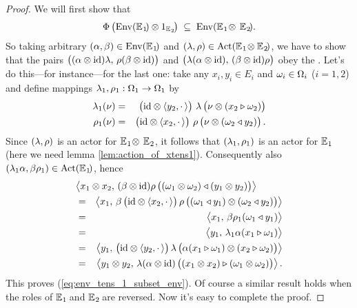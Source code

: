 \begin{proof}
  We will first show that
  \begin{equation} \label{eq:env_tens_1_subset_env}
    \Phi\left(\vertM  \Env(\EEone) \tens 1_{\EEtwo}\right)
            \;\subseteq\;  \Env(\EEone \tens\, \EEtwo).
  \end{equation}
  So taking arbitrary $(\alpha, \beta) \in \mbox{\rm Env}(\mathbb{E}_{\hspace{0.5pt}1}\!)$
  and $(\lambda,\rho) \in \mbox{\rm Act}(\mathbb{E}_{\hspace{0.5pt}1}\! \otimes \mathbb{E}_{\hspace{0.5pt}2}\!)$,
  we have to show that the pairs
  $\left(\vertM (\alpha\tens \id)\lam, \, \rho(\beta\tens \id) \right)$ and
  $\left(\vertM \lam(\alpha\tens \id), \, (\beta\tens \id)\rho \right)$ obey the \biap\@.
  Let's do this---for instance---for the last one:
  take any $x_i, y_i \in E_i$ and $\omega_i \in \Omega_i$ ($i=1,2$) and
  define mappings $\lambda_1, \rho_1: \Omega_1 \rightarrow \Omega_1$ by
  \begin{eqnarray*}
     \lam_1(\nu)  &=&  \left(\vertM \id \tens \pairdot{y_2} \right)\,
                          \lam\left(\vertM \nu \tens (x_2 \lact \om_2) \right)  \\
     \rho_1(\nu)  &=&  \left(\vertM \id \tens \pairdot{x_2} \right)\,
                          \rho\left(\vertM \nu \tens (\om_2 \ract y_2) \right).
  \end{eqnarray*}
  Since $(\lambda,\rho)$ is an actor for $\mathbb{E}_{\hspace{0.5pt}1}\! \otimes\, \mathbb{E}_{\hspace{0.5pt}2}\!\,$,
  it follows that $(\lambda_1,\rho_1)$ is an actor for $\mathbb{E}_{\hspace{0.5pt}1}\!$
  (here we need lemma \ref{lem:action_of_xtens1}).
  Consequently also $(\lambda_1\alpha,\beta\rho_1) \in \mbox{\rm Act}(\mathbb{E}_{\hspace{0.5pt}1}\!)$, hence
  \begin{eqnarray*}
     \lefteqn{\pairM{x_1 \tens x_2}{(\beta \tens \id)
           \rho\left(\vertM (\om_1 \tens \om_2) \ract (y_1 \tens y_2)\right)} }   \\
    &=&
      \pairM{x_1}{\beta \left(\vertM \id \tens \pairdot{x_2} \right)
           \rho\left(\vertM (\om_1 \ract y_1) \tens (\om_2 \ract y_2)\right)}          \\
    &=&
      \pairM{x_1}{\beta\rho_1(\om_1 \ract y_1)}                   \\
    &=&
      \pairM{y_1}{\lam_1\alpha(x_1 \lact \om_1)}                  \\
    &=&
      \pairM{y_1}{\left(\vertM \id \tens \pairdot{y_2} \right)
           \lam\left(\vertM \alpha(x_1 \lact \om_1) \tens (x_2 \lact \om_2) \right)}  \\
    &=&
      \pairM{y_1 \tens y_2}{\lam ( \alpha \tens \id)
           \left(\vertM (x_1 \tens x_2) \lact (\om_1 \tens \om_2)  \right)}.
  \end{eqnarray*}
  This proves (\ref{eq:env_tens_1_subset_env}). Of course a similar result
  holds when the roles of $\mathbb{E}_{\hspace{0.5pt}1}\!$ and $\mathbb{E}_{\hspace{0.5pt}2}\!$ are reversed.
  Now it's easy to complete the proof.
\end{proof}




